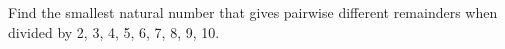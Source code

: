 \problem
Find the smallest natural number that gives pairwise different remainders when
divided by 2, 3, 4, 5, 6, 7, 8, 9, 10.
\solution
\endproblem
